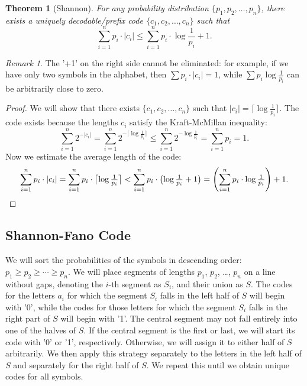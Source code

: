 \documentclass[12pt,sans]{article}
\newcommand{\seqn}[2]{{#1}_1,{#1}_2,\dotsc,{#1}_{#2}}
\theoremstyle{definition}
\theoremstyle{plain}
\newtheorem{theorem}{Theorem}[section]
\theoremstyle{remark}
\newtheorem{remark}{Remark}[section]
\begin{document}
\begin{theorem}[Shannon]\label{thm:shannon:optcode}
    For any probability distribution \(\{\seqn{p}{n}\}\), there exists
    a uniquely decodable/prefix code \(\{\seqn{c}{n}\}\) such that
    \[
    \sum_{i=1}^n p_i \cdot |c_i| \le \sum_{i=1}^n p_i \cdot \log \frac{1}{p_i} + 1.
    \]
\end{theorem}
\begin{remark}
    The '+1' on the right side cannot be eliminated: for example, if we have only two symbols in
    the alphabet, then \(\sum p_i \cdot |c_i| = 1\), while \(\sum
    p_i \log \frac{1}{p_i}\) can be arbitrarily close to zero.
\end{remark}

\begin{proof}
    We will show that there exists \(\{\seqn{c}{n}\}\) such that \(|c_i| =
    \bigl\lceil \log \frac{1}{p_i} \bigr\rceil\). The code exists because the lengths \(c_i\) satisfy
    the Kraft-McMillan inequality:
    \[
    \sum_{i=1}^n 2^{-|c_i|} =
    \sum_{i=1}^n 2^{-\lceil \log \frac{1}{p_i} \rceil} \le
    \sum_{i=1}^n 2^{-\log \frac{1}{p_i}} =
    \sum_{i=1}^n p_i = 1.
    \]
    Now we estimate the average length of the code:
    \[
    \sum_{i=1}^n p_i \cdot |c_i| =
    \sum_{i=1}^n p_i \cdot \bigl\lceil \log{\textstyle\frac{1}{p_i}} \bigr\rceil <
    \sum_{i=1}^n p_i \cdot \bigl(\log{\textstyle\frac{1}{p_i}} + 1\bigr) =
    \left(\sum_{i=1}^n p_i \cdot \log{\textstyle\frac{1}{p_i}}\right) + 1. \qedhere
    \]
\end{proof}

\subsection{Shannon-Fano Code}
We will sort the probabilities of the symbols in descending order: \(p_1 \ge p_2 \ge \dotsb \ge p_n\).
We will place segments of lengths \(p_1\), \(p_2\), \ldots, \(p_n\) on a line without gaps,
denoting the \(i\)-th segment as \(S_i\), and their union as \(S\).
The codes for the letters \(a_i\) for which the segment \(S_i\) falls in the left half of \(S\)
will begin with '0', while the codes for those letters for which the segment \(S_i\) falls
in the right part of \(S\) will begin with '1'. The central segment may not fall entirely
into one of the halves of \(S\). If the central segment is the first
or last, we will start its code with '0' or '1', respectively.
Otherwise, we will assign it to either half of \(S\) arbitrarily. We then
apply this strategy separately to the letters in the left half of \(S\) and separately for
the right half of \(S\). We repeat this until we obtain unique codes for all
symbols.
\end{document}
